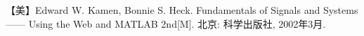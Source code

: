 \cleardoublepage
{}
{}
\begin{thebibliography}{99}
     【美】Edward W. Kamen, Bonnie S. Heck. Fundamentals of Signals and Systems —— Using the Web and MATLAB 2nd[M]. 北京: 科学出版社, 2002年3月.
\end{thebibliography}




